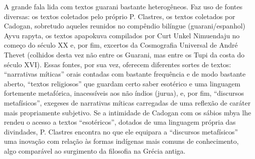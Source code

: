\documentclass{article}
\begin{document}
A grande fala lida com textos guarani bastante heterog\^eneos. Faz uso
de fontes diversas: os textos coletados pelo pr\'oprio P. Clastres, os
textos coletados por Cadogan, sobretudo aqueles reunidos no comp\^endio
bil\'ingue (guarani/espanhol) Ayvu rapyta, os textos apapokuva
compilados por Curt Unkel Nimuendaju no come\c{c}o do s\'eculo XX e,
por fim, excertos da Cosmografia Universal de Andr\'e Thevet (colhidos
desta vez n\~ao entre os Guarani, mas entre os Tupi da costa do
s\'eculo XVI). Essas fontes, por sua vez, oferecem diferentes sortes de
textos: {\textquotedblleft}narrativas m\'iticas{\textquotedblright}
orais contadas com bastante frequ\^encia e de modo bastante aberto,
{\textquotedblleft}textos religiosos{\textquotedblright} que guardam
certo saber esot\'erico e uma linguagem fortemente metaf\'orica,
inacess\'iveis aos n\~ao \'indios (jurua), e, por fim,
{\textquotedblleft}discursos metaf\'isicos{\textquotedblright},
exegeses de narrativas m\'iticas carregadas de uma reflex\~ao de
car\'ater mais propriamente subjetivo. Se a intimidade de Cadogan com
os s\'abios mbya lhe rendeu o acesso a textos
{\textquotedblleft}esot\'ericos{\textquotedblright}, dotados de uma
linguagem pr\'opria das divindades, P. Clastres encontra no que ele
equipara a {\textquotedblleft}discursos
metaf\'isicos{\textquotedblright} uma inova\c{c}\~ao com rela\c{c}\~ao
\`as formas ind\'igenas mais comuns de conhecimento, algo compar\'avel
ao surgimento da filosofia na Gr\'ecia antiga.
\end{document}
